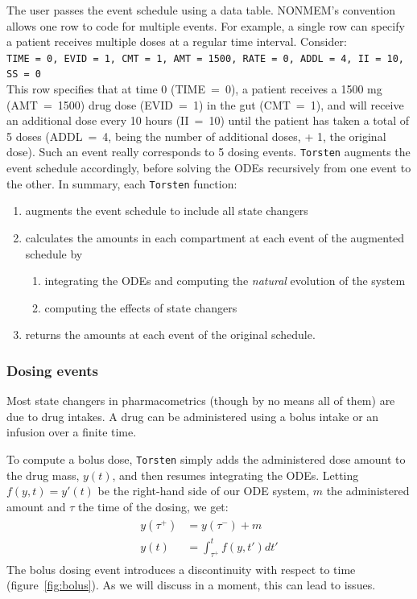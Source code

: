 \documentclass[11pt]{article}
\begin{document}
The user passes the event schedule using a data table. 
%
NONMEM's convention allows one row to code for multiple events. For example, a 
single row can specify a patient receives multiple doses at a regular time interval. Consider: \\
%
\texttt{TIME = 0, EVID = 1, CMT = 1, AMT = 1500, RATE = 0, ADDL = 4, II = 10, SS = 0} \\
%
This row specifies that at time 0 (\hbox{TIME = 0}), a patient receives a 1500 mg 
(\hbox{AMT = 1500}) drug dose (\hbox{EVID = 1}) in the gut (\hbox{CMT = 1}), and will 
receive an additional dose every 10 hours (\hbox{II = 10}) until the patient has taken a 
total of 5 doses (\hbox{ADDL = 4}, being the number of additional doses, + 1, the original 
dose). Such an event really corresponds to 5 dosing events. \texttt{Torsten} augments the event 
schedule accordingly, before solving the ODEs recursively from one event to the other.
%
In summary, each \texttt{Torsten} function:
\begin{enumerate}
  \item augments the event schedule to include all state changers
  \item calculates the amounts in each compartment at each event of the augmented schedule by
  \begin{enumerate}
    \item integrating the ODEs and computing the \textit{natural} evolution of the system
    \item computing the effects of state changers
  \end{enumerate}
  \item returns the amounts at each event of the original schedule.
\end{enumerate}

\subsubsection{Dosing events}

Most state changers in pharmacometrics (though by no means all of them) are due to drug
intakes. A drug can be administered using a bolus intake or an infusion over a finite time.

To compute a bolus dose, \texttt{Torsten} simply adds the administered dose amount to the drug 
mass, $y(t)$, and then resumes integrating the ODEs. Letting $f(y, t) = y'(t)$ be the right-hand 
side of our ODE system, $m$ the administered amount and $\tau$ the time of the dosing, we get:
%
\begin{eqnarray}
  \begin{aligned}
  y(\tau ^ +) &= y(\tau^-) + m \\
  y(t) &= \int_{\tau ^ +} ^ t f(y, t') dt'
  \end{aligned}
\end{eqnarray}
%
The bolus dosing event introduces a discontinuity with respect to time (figure~\ref{fig:bolus}).
As we will discuss in a moment, this can lead to issues.
\end{document}
